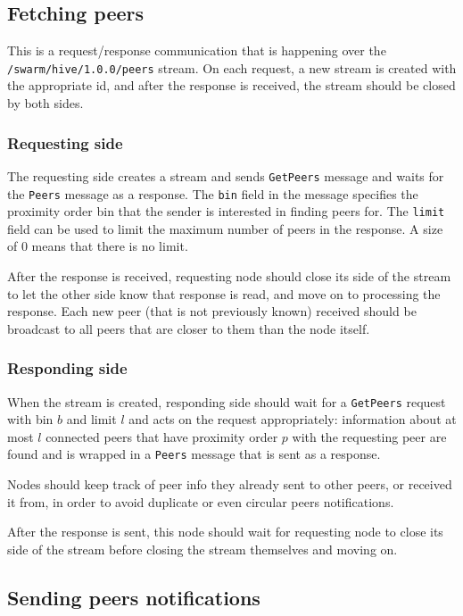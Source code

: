 \subsection{Fetching peers \statusgreen}

This is a request/response communication that is happening over the \lstinline{/swarm/hive/1.0.0/peers} stream. On each request, a new stream is created with the appropriate id, and after the response is received, the stream should be closed by both sides.

\subsubsection{Requesting side}

The requesting side creates a stream and sends \lstinline{GetPeers} message and waits for the \lstinline{Peers} message as a response. The \lstinline{bin} field in the message specifies the proximity order bin that the sender is interested in finding peers for. The \lstinline{limit} field can be used to limit the maximum number of peers in the response. A size of 0 means that there is no limit. 

After the response is received, requesting node should close its side of the stream to let the other side know that response is read, and move on to processing the response. Each new peer (that is not previously known) received should be broadcast to all peers that are closer to them than the node itself.

\subsubsection{Responding side}

When the stream is created, responding side should wait for a \lstinline{GetPeers} request with bin $b$ and limit $l$ and acts on the request appropriately: information about at most $l$ connected peers that have proximity order $p$ with the requesting peer are found and is wrapped in a \lstinline{Peers} message that is sent as a response.

Nodes should keep track of peer info they already sent to other peers, or received it from, in order to avoid  duplicate or even circular peers notifications.

After the response is sent, this node should wait for requesting node to close its side of the stream before closing the stream themselves and moving on.

\subsection{Sending peers notifications \statusgreen}

